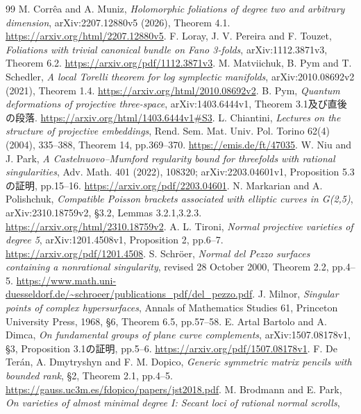 \documentclass[a4paper,11pt]{ltjsarticle}
\theoremstyle{definition}
\begin{document}
\begin{thebibliography}{99}
 M. Corr\^ea and A. Muniz,
\emph{Holomorphic foliations of degree two and arbitrary dimension},
arXiv:2207.12880v5 (2026), Theorem 4.1.
\url{https://arxiv.org/html/2207.12880v5}.
 F. Loray, J. V. Pereira and F. Touzet,
\emph{Foliations with trivial canonical bundle on Fano 3-folds},
arXiv:1112.3871v3, Theorem 6.2.
\url{https://arxiv.org/pdf/1112.3871v3}.
 M. Matviichuk, B. Pym and T. Schedler,
\emph{A local Torelli theorem for log symplectic manifolds},
arXiv:2010.08692v2 (2021), Theorem 1.4.
\url{https://arxiv.org/html/2010.08692v2}.
 B. Pym,
\emph{Quantum deformations of projective three-space},
arXiv:1403.6444v1, Theorem 3.1及び直後の段落.
\url{https://arxiv.org/html/1403.6444v1#S3}.
 L. Chiantini,
\emph{Lectures on the structure of projective embeddings},
Rend. Sem. Mat. Univ. Pol. Torino 62(4) (2004), 335--388,
Theorem 14, pp.369--370.
\url{https://emis.de/ft/47035}.
 W. Niu and J. Park,
\emph{A Castelnuovo--Mumford regularity bound for threefolds with rational singularities},
Adv. Math. 401 (2022), 108320; arXiv:2203.04601v1,
Proposition 5.3の証明, pp.15--16.
\url{https://arxiv.org/pdf/2203.04601}.
 N. Markarian and A. Polishchuk,
\emph{Compatible Poisson brackets associated with elliptic curves in G(2,5)},
arXiv:2310.18759v2, \S3.2, Lemmas 3.2.1,3.2.3.
\url{https://arxiv.org/html/2310.18759v2}.
 A. L. Tironi,
\emph{Normal projective varieties of degree 5},
arXiv:1201.4508v1, Proposition 2, pp.6--7.
\url{https://arxiv.org/pdf/1201.4508}.
 S. Schr\"oer,
\emph{Normal del Pezzo surfaces containing a nonrational singularity},
revised 28 October 2000, Theorem 2.2, pp.4--5.
\url{https://www.math.uni-duesseldorf.de/~schroeer/publications_pdf/del_pezzo.pdf}.
 J. Milnor,
\emph{Singular points of complex hypersurfaces},
Annals of Mathematics Studies 61, Princeton University Press, 1968,
\S6, Theorem 6.5, pp.57--58.
 E. Artal Bartolo and A. Dimca,
\emph{On fundamental groups of plane curve complements},
arXiv:1507.08178v1, \S3, Proposition 3.1の証明, pp.5--6.
\url{https://arxiv.org/pdf/1507.08178v1}.
 F. De Ter\'an, A. Dmytryshyn and F. M. Dopico,
\emph{Generic symmetric matrix pencils with bounded rank},
\S2, Theorem 2.1, pp.4--5.
\url{https://gauss.uc3m.es/fdopico/papers/jst2018.pdf}.
 M. Brodmann and E. Park,
\emph{On varieties of almost minimal degree I: Secant loci of rational normal scrolls},

\end{thebibliography}
\end{document}
